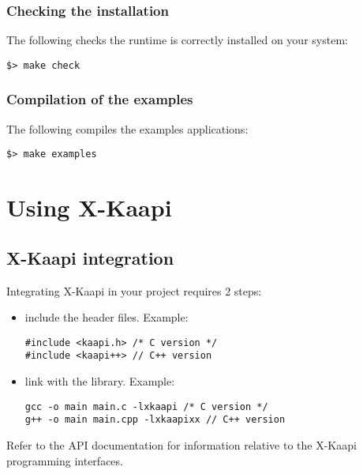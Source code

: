 \documentclass{article}
\newcommand{\kaapi}{\textsc{X}-Kaapi\xspace}
\begin{document}
\subsubsection{Checking the installation}
The following checks the runtime is correctly installed on your system:
\begin{verbatim}
$> make check
\end{verbatim}

\subsubsection{Compilation of the examples}
The following compiles the examples applications:
\begin{verbatim}
$> make examples
\end{verbatim}

\section{Using \kaapi}

\subsection{\kaapi integration}
Integrating \kaapi in your project requires 2 steps:
\begin{itemize}
\item include the header files. Example:
\begin{verbatim} 
#include <kaapi.h> /* C version */
#include <kaapi++> // C++ version
\end{verbatim}
\item link with the library. Example:
\begin{verbatim} 
gcc -o main main.c -lxkaapi /* C version */
g++ -o main main.cpp -lxkaapixx // C++ version
\end{verbatim}
\end{itemize}
Refer to the API documentation for information relative
to the \kaapi programming interfaces.
\end{document}
